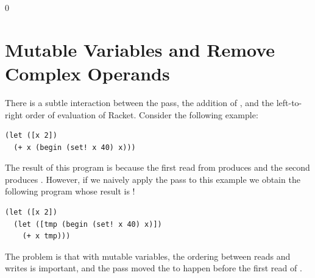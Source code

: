 \documentclass[7x10]{TimesAPriori_MIT}%
\def\racketEd{0}
\def\edition{1}
\numberwithin{theorem}{chapter}
\numberwithin{definition}{chapter}
\numberwithin{equation}{chapter}
\begin{document}
{\if\edition\racketEd
\section{Mutable Variables and Remove Complex Operands}

There is a subtle interaction between the
 pass, the addition of ,
and the left-to-right order of evaluation of Racket. Consider the
following example:
\begin{lstlisting}
(let ([x 2])
  (+ x (begin (set! x 40) x)))
\end{lstlisting}
The result of this program is  because the first read from
 produces  and the second produces . However,
if we naively apply the  pass to this
example we obtain the following program whose result is !
\begin{lstlisting}
(let ([x 2])
  (let ([tmp (begin (set! x 40) x)])
    (+ x tmp)))
\end{lstlisting}
The problem is that with mutable variables, the ordering between
reads and writes is important, and the
 pass moved the  to happen
before the first read of .

}
\end{document}
